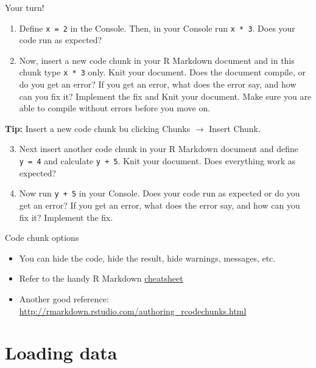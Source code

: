 \documentclass[
  ignorenonframetext,
]{beamer}
\begin{document}
\begin{frame}[fragile]{Your turn!}
\protect\hypertarget{your-turn-3}{}
\begin{enumerate}
\item
  Define \texttt{x\ =\ 2} in the Console. Then, in your Console run
  \texttt{x\ *\ 3}. Does your code run as expected?
\item
  Now, insert a new code chunk in your R Markdown document and in this
  chunk type \texttt{x\ *\ 3} only. Knit your document. Does the
  document compile, or do you get an error? If you get an error, what
  does the error say, and how can you fix it? Implement the fix and Knit
  your document. Make sure you are able to compile without errors before
  you move on.
\end{enumerate}

\textbf{Tip:} Insert a new code chunk bu clicking Chunks \(\rightarrow\)
Insert Chunk.

\begin{enumerate}
\setcounter{enumi}{2}
\item
  Next insert another code chunk in your R Markdown document and define
  \texttt{y\ =\ 4} and calculate \texttt{y\ +\ 5}. Knit your document.
  Does everything work as expected?
\item
  Now run \texttt{y\ +\ 5} in your Console. Does your code run as
  expected or do you get an error? If you get an error, what does the
  error say, and how can you fix it? Implement the fix.
\end{enumerate}
\end{frame}

\begin{frame}{Code chunk options}
\protect\hypertarget{code-chunk-options}{}
\begin{itemize}
\item
  You can hide the code, hide the result, hide warnings, messages, etc.
\item
  Refer to the handy R Markdown
  \href{https://www.rstudio.com/wp-content/uploads/2015/02/rmarkdown-cheatsheet.pdf}{cheatsheet}
\item
  Another good reference:
  \url{http://rmarkdown.rstudio.com/authoring_rcodechunks.html}
\end{itemize}
\end{frame}

\hypertarget{loading-data}{%
\section{Loading data}\label{loading-data}}
\end{document}
